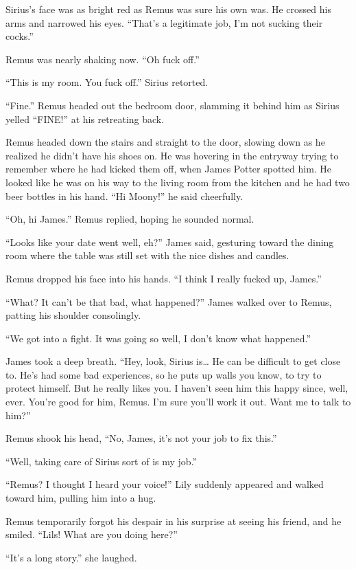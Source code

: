 \documentclass[12pt,twoside,openright]{memoir}
\begin{document}
Sirius's face was as bright red as Remus was sure his own was. He crossed his arms and narrowed his eyes. ``That's a legitimate job, I'm not sucking their cocks.''

Remus was nearly shaking now. ``Oh fuck off.''

``This is my room. You fuck off.'' Sirius retorted.

``Fine.'' Remus headed out the bedroom door, slamming it behind him as Sirius yelled ``FINE!'' at his retreating back.

Remus headed down the stairs and straight to the door, slowing down as he realized he didn't have his shoes on. He was hovering in the entryway trying to remember where he had kicked them off, when James Potter spotted him. He looked like he was on his way to the living room from the kitchen and he had two beer bottles in his hand. ``Hi Moony!'' he said cheerfully. 

``Oh, hi James.'' Remus replied, hoping he sounded normal.

``Looks like your date went well, eh?'' James said, gesturing toward the dining room where the table was still set with the nice dishes and candles.

Remus dropped his face into his hands. ``I think I really fucked up, James.''

``What? It can't be that bad, what happened?'' James walked over to Remus, patting his shoulder consolingly.

``We got into a fight. It was going so well, I don't know what happened.''

James took a deep breath. ``Hey, look, Sirius is… He can be difficult to get close to. He's had some bad experiences, so he puts up walls you know, to try to protect himself. But he really likes you. I haven't seen him this happy since, well, ever. You're good for him, Remus. I'm sure you'll work it out. Want me to talk to him?''

Remus shook his head, ``No, James, it's not your job to fix this.''

``Well, taking care of Sirius sort of is my job.''

``Remus? I thought I heard your voice!'' Lily suddenly appeared and walked toward him, pulling him into a hug. 

Remus temporarily forgot his despair in his surprise at seeing his friend, and he smiled. ``Lils! What are you doing here?'' 

``It's a long story.'' she laughed. 
\end{document}
